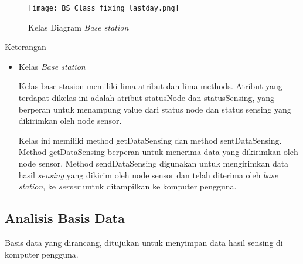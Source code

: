 \begin{itemize}
    \begin{figure}[H]
    	\centering  
    	\texttt{[image: BS\_Class\_fixing\_lastday.png]}
    	\caption[Kelas Diagram \textit{Base station}]{Kelas Diagram \textit{Base station}} 
    	\label{fig:Kelas Diagram Base Station} 
    \end{figure}
    
     
    Keterangan
    \begin{itemize}
        \item Kelas \textit{Base station}
        
        Kelas base stasion memiliki lima atribut dan lima methods. Atribut yang terdapat dikelas ini adalah atribut statusNode dan statusSensing, yang berperan untuk menampung value dari status node dan status sensing yang dikirimkan oleh node sensor.
        
        Kelas ini memiliki method getDataSensing dan method sentDataSensing. Method getDataSensing berperan untuk menerima data yang dikirimkan oleh node sensor. Method sendDataSensing digunakan untuk mengirimkan data hasil \textit{sensing} yang dikirim oleh node sensor dan telah diterima oleh \textit{base station}, ke \textit{server} untuk ditampilkan ke komputer pengguna.
    \end{itemize}
\end{itemize}

\clearpage

\subsection{Analisis Basis Data}

    Basis data yang dirancang, ditujukan untuk menyimpan data hasil sensing di komputer pengguna. 

